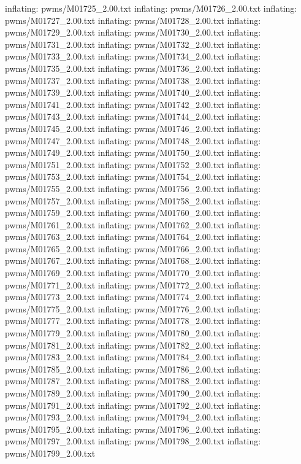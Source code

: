 \documentclass[letterpaper,10pt,english]{sphinxmanual}
\begin{document}
{\begin{sphinxVerbatim}[commandchars=\\\{\}]
  inflating: pwms/M01725\_2.00.txt
  inflating: pwms/M01726\_2.00.txt
  inflating: pwms/M01727\_2.00.txt
  inflating: pwms/M01728\_2.00.txt
  inflating: pwms/M01729\_2.00.txt
  inflating: pwms/M01730\_2.00.txt
  inflating: pwms/M01731\_2.00.txt
  inflating: pwms/M01732\_2.00.txt
  inflating: pwms/M01733\_2.00.txt
  inflating: pwms/M01734\_2.00.txt
  inflating: pwms/M01735\_2.00.txt
  inflating: pwms/M01736\_2.00.txt
  inflating: pwms/M01737\_2.00.txt
  inflating: pwms/M01738\_2.00.txt
  inflating: pwms/M01739\_2.00.txt
  inflating: pwms/M01740\_2.00.txt
  inflating: pwms/M01741\_2.00.txt
  inflating: pwms/M01742\_2.00.txt
  inflating: pwms/M01743\_2.00.txt
  inflating: pwms/M01744\_2.00.txt
  inflating: pwms/M01745\_2.00.txt
  inflating: pwms/M01746\_2.00.txt
  inflating: pwms/M01747\_2.00.txt
  inflating: pwms/M01748\_2.00.txt
  inflating: pwms/M01749\_2.00.txt
  inflating: pwms/M01750\_2.00.txt
  inflating: pwms/M01751\_2.00.txt
  inflating: pwms/M01752\_2.00.txt
  inflating: pwms/M01753\_2.00.txt
  inflating: pwms/M01754\_2.00.txt
  inflating: pwms/M01755\_2.00.txt
  inflating: pwms/M01756\_2.00.txt
  inflating: pwms/M01757\_2.00.txt
  inflating: pwms/M01758\_2.00.txt
  inflating: pwms/M01759\_2.00.txt
  inflating: pwms/M01760\_2.00.txt
  inflating: pwms/M01761\_2.00.txt
  inflating: pwms/M01762\_2.00.txt
  inflating: pwms/M01763\_2.00.txt
  inflating: pwms/M01764\_2.00.txt
  inflating: pwms/M01765\_2.00.txt
  inflating: pwms/M01766\_2.00.txt
  inflating: pwms/M01767\_2.00.txt
  inflating: pwms/M01768\_2.00.txt
  inflating: pwms/M01769\_2.00.txt
  inflating: pwms/M01770\_2.00.txt
  inflating: pwms/M01771\_2.00.txt
  inflating: pwms/M01772\_2.00.txt
  inflating: pwms/M01773\_2.00.txt
  inflating: pwms/M01774\_2.00.txt
  inflating: pwms/M01775\_2.00.txt
  inflating: pwms/M01776\_2.00.txt
  inflating: pwms/M01777\_2.00.txt
  inflating: pwms/M01778\_2.00.txt
  inflating: pwms/M01779\_2.00.txt
  inflating: pwms/M01780\_2.00.txt
  inflating: pwms/M01781\_2.00.txt
  inflating: pwms/M01782\_2.00.txt
  inflating: pwms/M01783\_2.00.txt
  inflating: pwms/M01784\_2.00.txt
  inflating: pwms/M01785\_2.00.txt
  inflating: pwms/M01786\_2.00.txt
  inflating: pwms/M01787\_2.00.txt
  inflating: pwms/M01788\_2.00.txt
  inflating: pwms/M01789\_2.00.txt
  inflating: pwms/M01790\_2.00.txt
  inflating: pwms/M01791\_2.00.txt
  inflating: pwms/M01792\_2.00.txt
  inflating: pwms/M01793\_2.00.txt
  inflating: pwms/M01794\_2.00.txt
  inflating: pwms/M01795\_2.00.txt
  inflating: pwms/M01796\_2.00.txt
  inflating: pwms/M01797\_2.00.txt
  inflating: pwms/M01798\_2.00.txt
  inflating: pwms/M01799\_2.00.txt

\end{sphinxVerbatim}}
\end{document}
